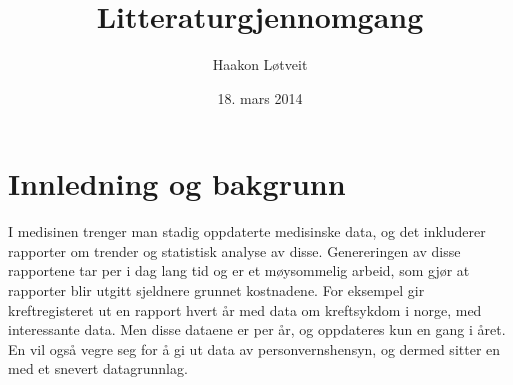 \documentclass[11pt]{article}
\begin{document}
\title{Litteraturgjennomgang}
\author{Haakon Løtveit}
\date{18. mars 2014}
\maketitle


\section{Innledning og bakgrunn}
I medisinen trenger man stadig oppdaterte medisinske data, og det inkluderer rapporter om trender og statistisk analyse av disse.
Genereringen av disse rapportene tar per i dag lang tid og er et møysommelig arbeid, som gjør at rapporter blir utgitt sjeldnere grunnet kostnadene.
For eksempel gir kreftregisteret ut en rapport hvert år med data om kreftsykdom i norge, med interessante data. Men disse dataene er per år, og oppdateres kun en gang i året.
En vil også vegre seg for å gi ut data av personvernshensyn, og dermed sitter en med et snevert datagrunnlag.
\end{document}
